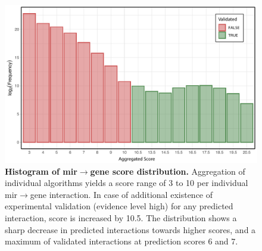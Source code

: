 \begin{figure}
\includegraphics[width=\textwidth]{figures/db-score-hist}
\caption[Graph database organisation.]{\textbf{Histogram of \ac{mir}$\to$gene score distribution.} Aggregation of individual algorithms yields a score range of 3 to 10 per individual \ac{mir}$\to$gene interaction. In case of additional existence of experimental validation (evidence level high) for any predicted interaction, score is increased by 10.5. The distribution shows a sharp decrease in predicted interactions towards higher scores, and a maximum of validated interactions at prediction scores 6 and 7. 
\label{fig:db-score-hist}}
\end{figure}

